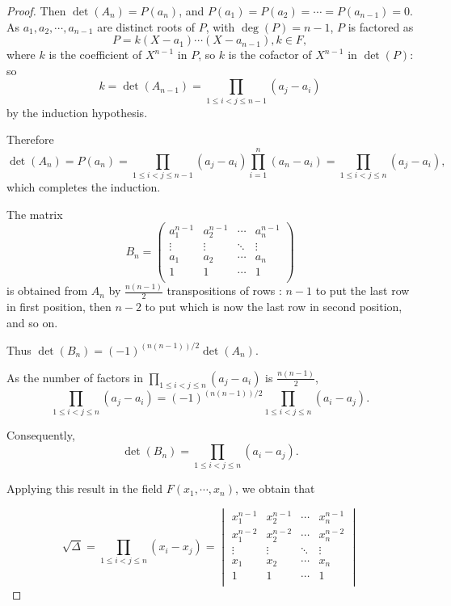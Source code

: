 \documentclass[11pt,a4paper]{article}
\begin{document}
\begin{proof}
Then $\det(A_n) = P(a_n)$, and $P(a_1) = P(a_2)=\cdots = P(a_{n-1}) = 0$.
As $a_1,a_2,\cdots,a_{n-1}$ are distinct roots of $P$, with $\deg(P) = n-1$, $P$ is factored as
$$P = k(X-a_1)\cdots(X-a_{n-1}), k \in F,$$
where $k$ is the coefficient of $X^{n-1}$ in $P$, so $k$ is the cofactor of $X^{n-1}$ in $\det(P)$:  so $$k = \det(A_{n-1} )= \prod\limits_{1\leq i < j \leq n-1} (a_j - a_i)$$
by the induction hypothesis.

Therefore $$ \det(A_n) = P(a_n) = \prod_{1\leq i < j \leq n-1} (a_j - a_i) \prod_{i=1}^n(a_n - a_i) = \prod_{1\leq i < j \leq n} (a_j - a_i),$$
which completes the induction.


The matrix 
$$
B_n = 
\begin{pmatrix}
a_1^{n-1}&  a_2^{n-1} &   \cdots   & a_n^{n-1}\\
\vdots & \vdots & \ddots & \vdots\\
a_1&  a_2 &   \cdots   & a_n\\
1    & 1     &   \cdots    & 1\\
\end{pmatrix}
$$
is obtained from $A_n$ by $\frac{n(n-1)}{2}$ transpositions of rows : $n-1$ to put the last row in first position, then $n-2$ to put which is now the last row  in second position, and so on.

Thus $\det(B_n) = (-1)^{(n(n-1))/2}\det(A_n)$.

As the number of factors in $\prod\limits_{1 \leq i < j \leq n} (a_j - a_i) $ is $\frac{n(n-1)}{2}$,
$$\prod\limits_{1 \leq i < j \leq n} (a_j - a_i) =(-1)^{(n(n-1))/2} \prod\limits_{1 \leq i < j \leq n} (a_i- a_j).$$

Consequently,
$$\det(B_n) = \prod\limits_{1 \leq i < j \leq n} (a_i- a_j).$$

Applying this result in the field $F(x_1,\cdots,x_n)$, we obtain that

$$\sqrt{\Delta} =\prod\limits_{1 \leq i < j \leq n} (x_i- x_j) =
\begin{vmatrix}
x_1^{n-1}&  x_2^{n-1} &   \cdots   & x_n^{n-1}\\
x_1^{n-2}&  x_2^{n-2} &   \cdots   & x_n^{n-2}\\
\vdots & \vdots & \ddots & \vdots\\
x_1&  x_2 &   \cdots   & x_n\\
1    & 1     &   \cdots    & 1\\
\end{vmatrix}
$$


\end{proof}
\end{document}
